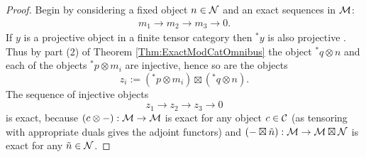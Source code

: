 \documentclass{amsart}
\begin{document}
\begin{proof}
Begin by considering a fixed object $n \in \mathcal N$ and an exact sequences in $\mathcal M$:
\begin{align*}
	m_1 \to m_2 \to m_3 \to 0. 
\end{align*}
If $y$ is a projective object in a finite tensor category then ${}^*y$ is also projective \cite[Prop. 2.3]{EO-ftc}. Thus by part (2) of Theorem \ref{Thm:ExactModCatOmnibus} the object ${}^*q \otimes n$ and each of the objects ${}^*p \otimes m_i$ are injective, hence so are the objects 
\begin{equation*}
	z_{i} :=  ({}^*p \otimes m_i) \boxtimes ({}^*q \otimes n).
\end{equation*}
The sequence of injective objects
\begin{equation*}
	z_1 \to z_2 \to z_3 \to 0
\end{equation*}
is exact, because $(c \otimes -): \mathcal M \rightarrow \mathcal M$ is exact for any object $c \in \mathcal C$ (as tensoring with appropriate duals gives the adjoint functors) and $(- \boxtimes \tilde{n}):\mathcal M \rightarrow \mathcal M \boxtimes \mathcal N$ is exact for any $\tilde{n} \in \mathcal N$.


\end{proof}
\end{document}
